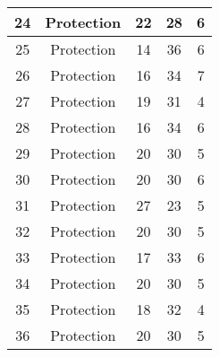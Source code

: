 \documentclass[results.tex]{subfiles}
\begin{document}
\begin{center}
\begin{tabular}{| c || c | c | c | c |}
            \hline
            24                      & Protection                   & 22                     & 28                      & 6                    \\
            \hline
            25                      & Protection                   & 14                     & 36                      & 6                    \\
            \hline
            26                      & Protection                   & 16                     & 34                      & 7                    \\
            \hline
            27                      & Protection                   & 19                     & 31                      & 4                    \\
            \hline
            28                      & Protection                   & 16                     & 34                      & 6                    \\
            \hline
            29                      & Protection                   & 20                     & 30                      & 5                    \\
            \hline
            30                      & Protection                   & 20                     & 30                      & 6                    \\
            \hline
            31                      & Protection                   & 27                     & 23                      & 5                    \\
            \hline
            32                      & Protection                   & 20                     & 30                      & 5                    \\
            \hline
            33                      & Protection                   & 17                     & 33                      & 6                    \\
            \hline
            34                      & Protection                   & 20                     & 30                      & 5                    \\
            \hline
            35                      & Protection                   & 18                     & 32                      & 4                    \\
            \hline
            36                      & Protection                   & 20                     & 30                      & 5                    \\

\end{tabular}
\end{center}
\end{document}
